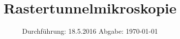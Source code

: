 

\subject{STM}
\title{Rastertunnelmikroskopie}
\date{
  Durchführung: 18.5.2016
  \hspace{3em}
  Abgabe: \today
}



\maketitle
\thispagestyle{empty}
\tableofcontents
\newpage






\printbibliography

\appendix
%


